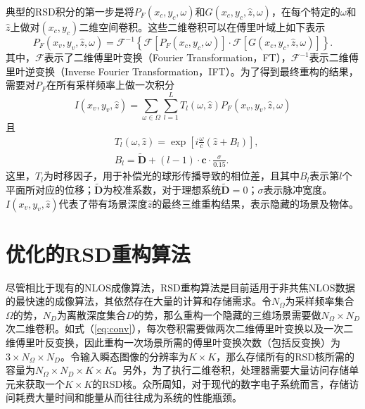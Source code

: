 \documentclass[master]{shtthesis}             %
\begin{document}
典型的RSD积分的第一步是将$P_F(x_c,y_c,\omega)$和$G(x_c,y_c,\hat{z},\omega)$，在每个特定的$\omega$和$\hat{z}$上做对$(x_c,y_c)$二维空间卷积。这些二维卷积可以在傅里叶域上如下表示
\begin{equation}\label{eq:conv}
  P_F(x_v, y_v, \hat{z}, \omega) = \mathcal{F}^{-1}\left\{\mathcal{F}\left[P_F(x_c, y_c, \omega)\right]\cdot \mathcal{F}\left[G(x_c, y_c, \hat{z}, \omega)\right]\right\}.
\end{equation}
其中，$\mathcal{F}$表示了二维傅里叶变换（Fourier Transformation，FT），$\mathcal{F}^{-1}$表示二维傅里叶逆变换（Inverse Fourier Transformation，IFT）。为了得到最终重构的结果，需要对$P_F$在所有采样频率上做一次积分
\begin{equation}
  I(x_v, y_v, \hat{z}) = \sum_{\omega \in  {\Omega}}\sum_{l=1}^{L} T_l(\omega, \hat{z}) P_F(x_v, y_v, \hat{z}, \omega)
\end{equation}
且
\begin{align}
    &T_l(\omega, \hat{z}) = \exp\left[i\frac{\omega}{c}(\hat{z}+B_l)\right],\label{eq:ts} \\
    &B_l =\tilde{\mathbf{D}} + (l-1)\cdot \mathbf{c}\cdot \frac{\sigma}{0.15}.
\end{align}
这里，$T_l$为时移因子，用于补偿光的球形传播导致的相位差，且其中$B_l$表示第$l$个平面所对应的位移；$\tilde{\mathbf{D}}$为校准系数，对于理想系统$\tilde{\mathbf{D}}=0$；$\sigma$表示脉冲宽度。$I(x_v,y_v,\hat{z})$代表了带有场景深度$\hat{z}$的最终三维重构结果，表示隐藏的场景及物体。

\section{优化的RSD重构算法}\label{sec:opt_rsd_algo}

尽管相比于现有的NLOS成像算法，RSD重构算法是目前适用于非共焦NLOS数据的最快速的成像算法，其依然存在大量的计算和存储需求。令$N_\Omega$为采样频率集合$\Omega$的势，$N_D$为离散深度集合$D$的势，那么重构一个隐藏的三维场景需要做$N_\Omega\times N_D$次二维卷积。如式（\ref{eq:conv}），每次卷积需要做两次二维傅里叶变换以及一次二维傅里叶反变换，因此重构一次场景所需的傅里叶变换次数（包括反变换）为$3\times N_\Omega \times N_D$。令输入瞬态图像的分辨率为$K\times K$，那么存储所有的RSD核所需的容量为$N_\Omega\times N_D\times K\times K$。另外，为了执行二维卷积，处理器需要大量访问存储单元来获取一个$K\times K$的RSD核。众所周知，对于现代的数字电子系统而言，存储访问耗费大量时间和能量从而往往成为系统的性能瓶颈\citep{hennessy2011computer}。
\end{document}
